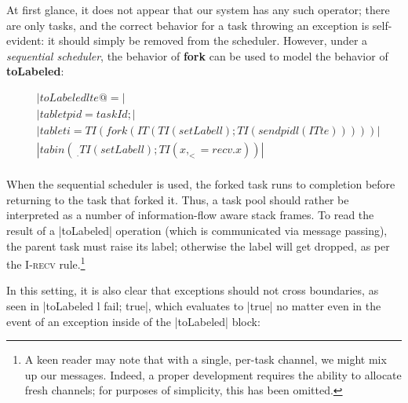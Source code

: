 At first glance, it does not appear that our system has any such operator;
there are only tasks, and the correct behavior for a task throwing
an exception is self-evident: it should simply be removed from the scheduler.
However, under a \emph{sequential scheduler}, the behavior of \textbf{fork}
can be used to model the behavior of \textbf{toLabeled}:

\begin{align*}
    & |toLabeled l te @= | \\
    & |tab let pid = taskId; | \\
    & |tab let i = TI (fork (IT (TI (setLabel l); TI (send pid l (IT te)))))| \\
    & |tab in (\ _ . TI (setLabel l); TI ( x, _ <= recv . x ))| \\
\end{align*}

When the sequential scheduler is used, the forked task runs to
completion before returning to the task that forked it.  Thus,
a task pool should rather be interpreted as a number of information-flow
aware stack frames.  To read the result of a |toLabeled| operation
(which is communicated via message passing), the parent task must raise
its label; otherwise the label will get dropped, as per the \textsc{I-recv} rule.\footnote{A keen reader may note that with a single, per-task
channel, we might mix up our messages.  Indeed, a proper development requires
the ability to allocate fresh channels; for purposes of simplicity, this
has been omitted.}

In this setting, it is also clear that exceptions should not cross boundaries,
as seen in |toLabeled l fail; true|, which evaluates to |true| no matter even in
the event of an exception inside of the |toLabeled| block:







